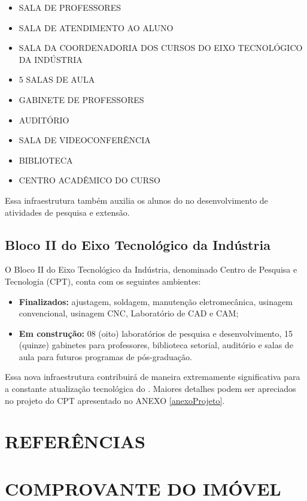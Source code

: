 \documentclass{paper}
\begin{document}
\begin{itemize}
\item SALA DE PROFESSORES
\item SALA DE ATENDIMENTO AO ALUNO
\item SALA DA COORDENADORIA DOS CURSOS DO EIXO TECNOLÓGICO DA INDÚSTRIA
\item 5 SALAS DE AULA
\item GABINETE DE PROFESSORES
\item AUDITÓRIO
\item SALA DE VIDEOCONFERÊNCIA
\item BIBLIOTECA
\item CENTRO ACADÊMICO DO CURSO
\end{itemize}

Essa infraestrutura também auxilia os alunos do \NOMECURSO no desenvolvimento de atividades de pesquisa e extensão.

\subsection{Bloco II do Eixo Tecnológico da Indústria}
O Bloco II do Eixo Tecnológico da Indústria, denominado Centro de Pesquisa e Tecnologia (CPT), conta com os seguintes ambientes:
\begin{itemize}
\item \textbf{Finalizados:} ajustagem, soldagem, manutenção eletromecânica, usinagem convencional, usinagem CNC, Laboratório de CAD e CAM;
\item \textbf{Em construção:} 08 (oito) laboratórios de pesquisa e desenvolvimento, 15 (quinze) gabinetes para professores, biblioteca setorial, auditório e salas de aula para futuros
programas de pós-graduação.
\end{itemize}

 Essa nova infraestrutura contribuirá de maneira extremamente significativa para a constante
atualização tecnológica do \NOMECURSO. Maiores detalhes podem ser apreciados no projeto do CPT apresentado no ANEXO \ref{anexoProjeto}.

\clearpage
\section{REFERÊNCIAS}


\clearpage\appendix
\pagestyle{empty}

\clearpage\section{COMPROVANTE DO IMÓVEL}
\label{anexoImovel}

\end{document}
